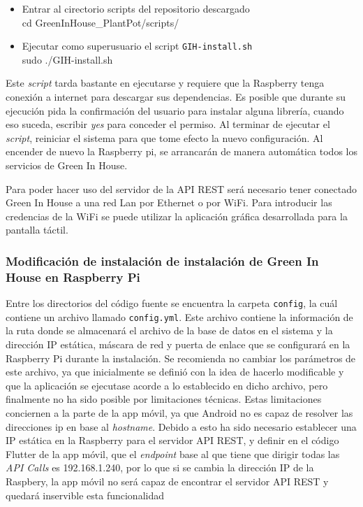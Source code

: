     \begin{itemize}
        \item Entrar al cirectorio scripts del repositorio descargado
        \\ cd GreenInHouse\_PlantPot/scripts/
        \item Ejecutar como superusuario el script \texttt{GIH-install.sh }
        \\ sudo ./GIH-install.sh
    \end{itemize}
    
    Este \textit{script} tarda bastante en ejecutarse y requiere que la Raspberry tenga conexión a internet para descargar sus dependencias. Es posible que durante su ejecución pida la confirmación del usuario para instalar alguna librería, cuando eso suceda, escribir \textit{yes} para conceder el permiso. Al terminar de ejecutar el \textit{script}, reiniciar el sistema para que tome efecto la nuevo configuración. Al encender de nuevo la Raspberry pi, se arrancarán de manera automática todos los servicios de Green In House. 
    
    Para poder hacer uso del servidor de la API REST será necesario tener conectado Green In House a una red Lan por Ethernet o por WiFi. Para introducir las credencias de la WiFi se puede utilizar la aplicación gráfica desarrollada para la pantalla táctil.

        \subsubsection{Modificación de instalación de instalación de Green In House en Raspberry Pi}
        
        Entre los directorios del código fuente se encuentra la carpeta \texttt{config}, la cuál contiene un archivo llamado \texttt{config.yml}. Este archivo contiene la información de la ruta donde se almacenará el archivo de la base de datos en el sistema y la dirección IP estática, máscara de red y puerta de enlace que se configurará en la Raspberry Pi durante la instalación. Se recomienda no cambiar los parámetros de este archivo, ya que inicialmente se definió con la idea de hacerlo modificable y que la aplicación se ejecutase acorde a lo establecido en dicho archivo, pero finalmente no ha sido posible por limitaciones técnicas. Estas limitaciones conciernen a la parte de la app móvil, ya que Android no es capaz de resolver las direcciones ip en base al \textit{hostname}. Debido a esto ha sido necesario establecer una IP estática en la Raspberry para el servidor API REST, y definir en el código Flutter de la app móvil, que el \textit{endpoint} base al que tiene que dirigir todas las \textit{API Calls} es 192.168.1.240, por lo que si se cambia la dirección IP de la Raspbery, la app móvil no será capaz de encontrar el servidor API REST y quedará inservible esta funcionalidad

